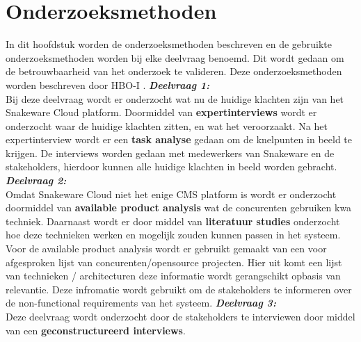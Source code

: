 \section{Onderzoeksmethoden}
In dit hoofdstuk worden de onderzoeksmethoden beschreven en de gebruikte onderzoeksmethoden worden bij elke deelvraag benoemd.
Dit wordt gedaan om de betrouwbaarheid van het onderzoek te valideren.
Deze onderzoeksmethoden worden beschreven door HBO-I \Parencite{HBO-i-reasearch-methods}.
\whitespace
\textit{\textbf{Deelvraag 1:} \SubquestionOne} \\
Bij deze deelvraag wordt er onderzocht wat nu de huidige klachten zijn van het Snakeware Cloud platform.
Doormiddel van \textbf{expertinterviews} wordt er onderzocht waar de huidige klachten zitten, en wat het veroorzaakt.
Na het expertinterview wordt er een \textbf{task analyse} gedaan om de knelpunten in beeld te krijgen.
De interviews worden gedaan met medewerkers van Snakeware en de stakeholders, hierdoor kunnen alle huidige klachten in beeld worden gebracht.
\whitespace
\textit{\textbf{Deelvraag 2:} \SubquestionTwo} \\
Omdat Snakeware Cloud niet het enige \gls{CMS} platform is wordt er onderzocht doormiddel van \textbf{available product analysis} wat de concurenten gebruiken kwa techniek.
Daarnaast wordt er door middel van \textbf{literatuur studies} onderzocht hoe deze technieken werken en mogelijk zouden kunnen passen in het systeem.
Voor de available product analysis wordt er gebruikt gemaakt van een voor afgesproken lijst van concurenten/opensource projecten.
Hier uit komt een lijst van technieken / architecturen deze informatie wordt gerangschikt opbasis van relevantie.
Deze infromatie wordt gebruikt om de stakeholders te informeren over de non-functional requirements van het systeem.
\whitespace
\textit{\textbf{Deelvraag 3:} \SubquestionThree} \\
Deze deelvraag wordt onderzocht door de stakeholders te interviewen door middel van een \textbf{geconstructureerd interviews}. 
